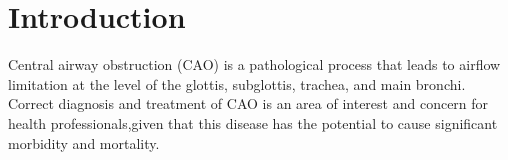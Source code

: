 \documentclass[10pt,a4paper]{article}
\begin{document}
\printtitle 
\printauthor


      \renewcommand{\sectype}[1]{}  %

   
      \section{Introduction}  %
      \label{Introduction}    %
      \sectype{sec-type}      %
      
      Central airway obstruction (CAO) is a pathological process that leads to 
      airflow limitation at the level of the glottis, subglottis, trachea, and main bronchi. 
      Correct diagnosis and treatment of CAO is an area of interest and concern for health 
      professionals,given that this disease has the potential to cause significant morbidity and mortality.
 
\lipsum
%
\end{document}
